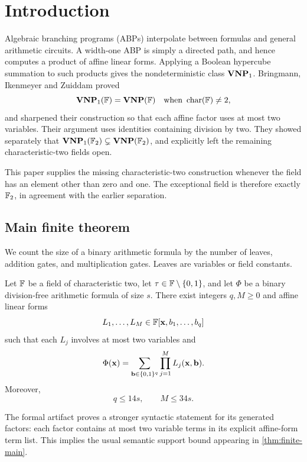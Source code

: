 \section{Introduction}

Algebraic branching programs (ABPs) interpolate between formulas and general arithmetic
circuits.  A width-one ABP is simply a directed path, and hence computes a product of
affine linear forms.  Applying a Boolean hypercube summation to such products gives the
nondeterministic class \(\mathbf{VNP}_{1}\).  Bringmann, Ikenmeyer and Zuiddam
\cite{BringmannIkenmeyerZuiddam2018,BringmannIkenmeyerZuiddam2017} proved
\[
  \mathbf{VNP}_{1}(\mathbb{F})=\mathbf{VNP}(\mathbb{F})
  \quad\text{when }\operatorname{char}(\mathbb{F})\neq 2,
\]
and sharpened their construction so that each affine factor uses at most two variables.
Their argument uses identities containing division by two.  They showed separately that
\(\mathbf{VNP}_{1}(\mathbb{F}_2)\subsetneq\mathbf{VNP}(\mathbb{F}_2)\), and explicitly left the remaining
characteristic-two fields open.

This paper supplies the missing characteristic-two construction whenever the field has an
element other than zero and one.  The exceptional field is therefore exactly \(\mathbb{F}_2\), in
agreement with the earlier separation.

\subsection{Main finite theorem}

We count the size of a binary arithmetic formula by the number of leaves, addition gates,
and multiplication gates.  Leaves are variables or field constants.

\begin{theorem}\label{thm:finite-main}
Let \(\mathbb{F}\) be a field of characteristic two, let
\(\tau\in\mathbb{F}\setminus\{0,1\}\), and let \(\Phi\) be a binary division-free arithmetic
formula of size \(s\).  There exist integers \(q,M\ge 0\) and affine linear forms
\[
  L_1,\ldots,L_M\in
  \mathbb{F}[\mathbf{x},b_1,\ldots,b_q]
\]
such that each \(L_j\) involves at most two variables and
\[
  \Phi(\mathbf{x})
  =\sum_{\mathbf{b}\in\{0,1\}^q}\prod_{j=1}^{M}L_j(\mathbf{x},\mathbf{b}).
\]
Moreover,
\[
  q\le 14s,
  \qquad
  M\le 34s.
\]
\end{theorem}

The formal artifact proves a stronger syntactic statement for its generated factors: each
factor contains at most two variable terms in its explicit affine-form term list.  This
implies the usual semantic support bound appearing in \cref{thm:finite-main}.

